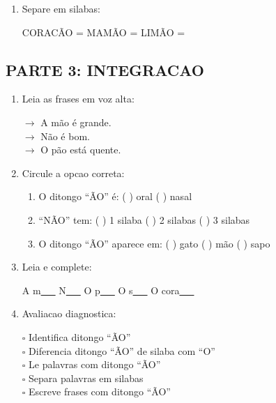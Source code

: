 \begin{exercicio}
\begin{enumerate}[resume]
  \item Separe em silabas:
  \begin{center}
  CORAC\~AO = \underline{\hspace{1cm}} \underline{\hspace{1cm}} \underline{\hspace{1cm}} \quad MAM\~AO = \underline{\hspace{1cm}} \underline{\hspace{1cm}} \underline{\hspace{1cm}} \quad LIM\~AO = \underline{\hspace{1cm}} \underline{\hspace{1cm}}
  \end{center}
\end{enumerate}

\subsection*{PARTE 3: INTEGRACAO}

\begin{enumerate}[resume]
  \item Leia as frases em voz alta:
  \begin{center}
  $\rightarrow$ A m\~ao \'e grande.\\
  $\rightarrow$ N\~ao \'e bom.\\
  $\rightarrow$ O p\~ao est\'a quente.
  \end{center}

  \item Circule a opcao correta:
  \begin{enumerate}[label=(\alph*)]
    \item O ditongo ``\~AO'' \'e: ( ) oral ( ) nasal
    \item ``N\~AO'' tem: ( ) 1 silaba ( ) 2 silabas ( ) 3 silabas
    \item O ditongo ``\~AO'' aparece em: ( ) gato ( ) m\~ao ( ) sapo
  \end{enumerate}

  \item Leia e complete:
  \begin{center}
  A m\underline{~~~} \quad N\underline{~~~} \quad O p\underline{~~~} \quad O s\underline{~~~} \quad O cora\underline{~~~}
  \end{center}

  \item Avaliacao diagnostica:
  \begin{center}
  $\square$ Identifica ditongo ``\~AO''\\
  $\square$ Diferencia ditongo ``\~AO'' de silaba com ``O''\\
  $\square$ Le palavras com ditongo ``\~AO''\\
  $\square$ Separa palavras em silabas\\
  $\square$ Escreve frases com ditongo ``\~AO''
  \end{center}
\end{enumerate}
\end{exercicio}

